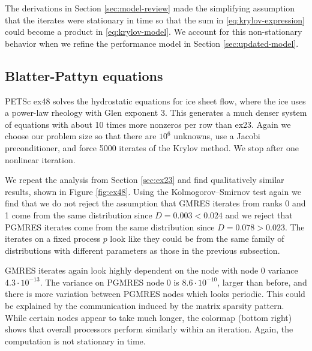 \documentclass[sigconf, anonymous]{acmart}
\begin{document}
The derivations in Section \ref{sec:model-review} made the simplifying assumption that the iterates were stationary in time so that the sum in \eqref{eq:krylov-expression} could become a product in \eqref{eq:krylov-model}. We account for this non-stationary behavior when we refine the performance model in Section \ref{sec:updated-model}.



\subsection{Blatter-Pattyn equations}
PETSc ex48 solves the hydrostatic equations for ice sheet flow, where the ice uses a power-law rheology with Glen exponent 3. This generates a much denser system of equations with about 10 times more nonzeros per row than ex23. Again we choose our problem size so that there are $10^6$ unknowns, use a Jacobi preconditioner, and force 5000 iterates of the Krylov method. We stop after one nonlinear iteration. 

We repeat the analysis from Section \ref{sec:ex23} and find qualitatively similar results, shown in Figure \ref{fig:ex48}. Using the Kolmogorov–Smirnov test again we find that we do not reject the assumption that GMRES iterates from ranks 0 and 1 come from the same distribution since $D = 0.003 < 0.024$ and we reject that PGMRES iterates come from the same distribution since $D = 0.078 > 0.023$.
The iterates on a fixed process $p$ look like they could be from the same family of distributions with different parameters as those in the previous subsection. 

GMRES iterates again look highly dependent on the node with node 0 variance $4.3\cdot10^{-13}$. The variance on PGMRES node 0 is $8.6\cdot10^{-10}$, larger than before, and there is more variation between PGMRES nodes which looks periodic. This could be explained by the communication induced by the matrix sparsity pattern. While certain nodes appear to take much longer, the colormap (bottom right) shows that overall processors perform similarly within an iteration. Again, the computation is  not stationary in time. 
\end{document}
